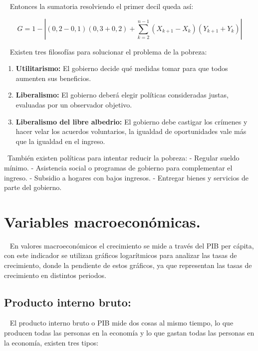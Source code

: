 \documentclass[
  letterpaper,
  DIV=11,
  numbers=noendperiod]{scrreport}
\providecommand{\tightlist}{%
  \setlength{\itemsep}{0pt}\setlength{\parskip}{0pt}}\usepackage{longtable,booktabs,array}
\begin{document}
~ Entonces la sumatoria resolviendo el primer decil queda así:

\[
G=1-\left|\left(0,2-0,1\right)\left(0,3+0,2\right)+\sum_{k=2}^{n-1}\left(X_{k+1}-X_k\right)\left(Y_{k+1}+Y_k\right)\right|
\]

~ Existen tres filosofías para solucionar el problema de la pobreza:

\begin{enumerate}
\def\labelenumi{\arabic{enumi})}
\tightlist
\item
  \textbf{Utilitarismo:} El gobierno decide qué medidas tomar para que
  todos aumenten sus beneficios.
\item
  \textbf{Liberalismo:} El gobierno deberá elegir políticas consideradas
  justas, evaluadas por un observador objetivo.
\item
  \textbf{Liberalismo del libre albedrio:} El gobierno debe castigar los
  crímenes y hacer velar los acuerdos voluntarios, la igualdad de
  oportunidades vale más que la igualdad en el ingreso.
\end{enumerate}

~También existen políticas para intentar reducir la pobreza: - Regular
sueldo mínimo. - Asistencia social o programas de gobierno para
complementar el ingreso. - Subsidio a hogares con bajos ingresos. -
Entregar bienes y servicios de parte del gobierno.


\hypertarget{variables-macroeconuxf3micas.}{%
\chapter{Variables
macroeconómicas.}\label{variables-macroeconuxf3micas.}}

~ En valores macroeconómicos el crecimiento se mide a través del PIB per
cápita, con este indicador se utilizan gráficos logarítmicos para
analizar las tasas de crecimiento, donde la pendiente de estos gráficos,
ya que representan las tasas de crecimiento en distintos periodos.

\hypertarget{producto-interno-bruto}{%
\section{Producto interno bruto:}\label{producto-interno-bruto}}

~ El producto interno bruto o PIB mide dos cosas al mismo tiempo, lo que
producen todas las personas en la economía y lo que gastan todas las
personas en la economía, existen tres tipos:
\end{document}
